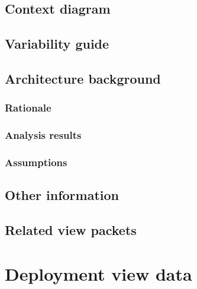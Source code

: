 \documentclass[a4paper,10pt]{book}
\begin{document}
\subsection{Context diagram}

\subsection{Variability guide}

\subsection{Architecture background}

\subsubsection{Rationale}

\subsubsection{Analysis results}

\subsubsection{Assumptions}

\subsection{Other information}

\subsection{Related view packets}



\section{Deployment view data}
\end{document}

